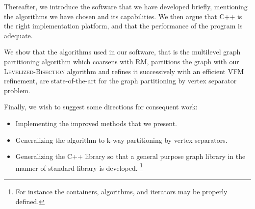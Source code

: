 \documentclass[a4paper,12pt]{article}
\begin{document}
Thereafter, we introduce the software that we have developed briefly,
mentioning the algorithms we have chosen and its capabilities. We then
argue that C++ is the right implementation platform, and that the
performance of the program is adequate.

We show that the algorithms used in our software, that is the
multilevel graph partitioning algorithm which coarsens with RM,
partitions the graph with our \textsc{Levelized-Bisection} algorithm
and refines it successively with an efficient VFM refinement, are
state-of-the-art for the graph partitioning by vertex separator
problem.

Finally, we wish to suggest some directions for consequent work:
\begin{itemize}
\item Implementing the improved methods that we present.
\item Generalizing the algorithm to k-way partitioning by vertex
separators.
\item Generalizing the C++ library so that a general purpose graph
library in the manner of standard library is developed. \footnote{For
instance the containers, algorithms, and iterators may be properly defined.}
\end{itemize}






%
\end{document}
